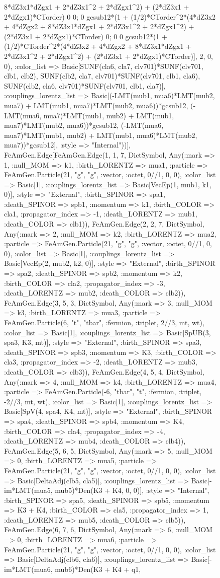 \documentclass{revtex4}
\begin{document}
\begin{figure}[!htb]
\begin{center}
{8*dZ3x1*dZgx1 + 2*dZ3x1^2 + 2*dZgx1^2) + (2*dZ3x1 + 2*dZgx1)*CTorder) 0 0; 0 gcsub12*(1 + (1/2)*CTorder^2*(4*dZ3x2 + 4*dZgx2 + 8*dZ3x1*dZgx1 + 2*dZ3x1^2 + 2*dZgx1^2) + (2*dZ3x1 + 2*dZgx1)*CTorder) 0; 0 0 gcsub12*(1 + (1/2)*CTorder^2*(4*dZ3x2 + 4*dZgx2 + 8*dZ3x1*dZgx1 + 2*dZ3x1^2 + 2*dZgx1^2) + (2*dZ3x1 + 2*dZgx1)*CTorder)], 2, 0, 0), :color_list => Basic[SUNF(cla6, cla7, clv701)*SUNF(clv701, clb1, clb2), SUNF(clb2, cla7, clv701)*SUNF(clv701, clb1, cla6), SUNF(clb2, cla6, clv701)*SUNF(clv701, clb1, cla7)], :couplings_lorentz_list => Basic[(-LMT(mub1, mua6)*LMT(mub2, mua7) + LMT(mub1, mua7)*LMT(mub2, mua6))*gcsub12, (-LMT(mua6, mua7)*LMT(mub1, mub2) + LMT(mub1, mua7)*LMT(mub2, mua6))*gcsub12, (-LMT(mua6, mua7)*LMT(mub1, mub2) + LMT(mub1, mua6)*LMT(mub2, mua7))*gcsub12], :style => "Internal"))], FeAmGen.Edge[FeAmGen.Edge(1, 1, 7, Dict{Symbol, Any}(:mark => 1, :null_MOM => k1, :birth_LORENTZ => mua1, :particle => FeAmGen.Particle(21, "g", "g", :vector, :octet, 0//1, 0, 0), :color_list => Basic[1], :couplings_lorentz_list => Basic[VecEp(1, mub1, k1, 0)], :style => "External", :birth_SPINOR => spa1, :death_SPINOR => spb1, :momentum => k1, :birth_COLOR => cla1, :propagator_index => -1, :death_LORENTZ => mub1, :death_COLOR => clb1)), FeAmGen.Edge(2, 2, 7, Dict{Symbol, Any}(:mark => 2, :null_MOM => k2, :birth_LORENTZ => mua2, :particle => FeAmGen.Particle(21, "g", "g", :vector, :octet, 0//1, 0, 0), :color_list => Basic[1], :couplings_lorentz_list => Basic[VecEp(2, mub2, k2, 0)], :style => "External", :birth_SPINOR => spa2, :death_SPINOR => spb2, :momentum => k2, :birth_COLOR => cla2, :propagator_index => -3, :death_LORENTZ => mub2, :death_COLOR => clb2)), FeAmGen.Edge(3, 5, 3, Dict{Symbol, Any}(:mark => 3, :null_MOM => k3, :birth_LORENTZ => mua3, :particle => FeAmGen.Particle(6, "t", "tbar", :fermion, :triplet, 2//3, mt, wt), :color_list => Basic[1], :couplings_lorentz_list => Basic[SpUB(3, spa3, K3, mt)], :style => "External", :birth_SPINOR => spa3, :death_SPINOR => spb3, :momentum => K3, :birth_COLOR => cla3, :propagator_index => -2, :death_LORENTZ => mub3, :death_COLOR => clb3)), FeAmGen.Edge(4, 5, 4, Dict{Symbol, Any}(:mark => 4, :null_MOM => k4, :birth_LORENTZ => mua4, :particle => FeAmGen.Particle(-6, "tbar", "t", :fermion, :triplet, -2//3, mt, wt), :color_list => Basic[1], :couplings_lorentz_list => Basic[SpV(4, spa4, K4, mt)], :style => "External", :birth_SPINOR => spa4, :death_SPINOR => spb4, :momentum => K4, :birth_COLOR => cla4, :propagator_index => -4, :death_LORENTZ => mub4, :death_COLOR => clb4)), FeAmGen.Edge(5, 6, 5, Dict{Symbol, Any}(:mark => 5, :null_MOM => 0, :birth_LORENTZ => mua5, :particle => FeAmGen.Particle(21, "g", "g", :vector, :octet, 0//1, 0, 0), :color_list => Basic[DeltaAdj(clb5, cla5)], :couplings_lorentz_list => Basic[-im*LMT(mua5, mub5)*Den(K3 + K4, 0, 0)], :style => "Internal", :birth_SPINOR => spa5, :death_SPINOR => spb5, :momentum => K3 + K4, :birth_COLOR => cla5, :propagator_index => 1, :death_LORENTZ => mub5, :death_COLOR => clb5)), FeAmGen.Edge(6, 7, 6, Dict{Symbol, Any}(:mark => 6, :null_MOM => 0, :birth_LORENTZ => mua6, :particle => FeAmGen.Particle(21, "g", "g", :vector, :octet, 0//1, 0, 0), :color_list => Basic[DeltaAdj(clb6, cla6)], :couplings_lorentz_list => Basic[-im*LMT(mua6, mub6)*Den(K3 + K4 + q1, }
\end{center}
\end{figure}
\end{document}
